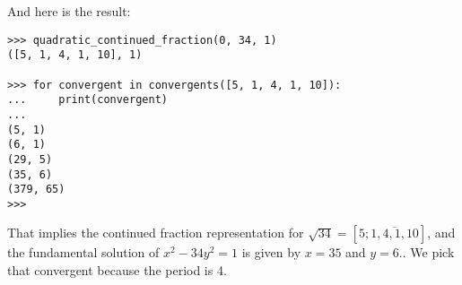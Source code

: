 \documentclass{article}
\begin{document}
And here is the result:
\begin{verbatim}
>>> quadratic_continued_fraction(0, 34, 1)
([5, 1, 4, 1, 10], 1)

>>> for convergent in convergents([5, 1, 4, 1, 10]):
...     print(convergent)
...
(5, 1)
(6, 1)
(29, 5)
(35, 6)
(379, 65)
>>>
\end{verbatim}

That implies the continued fraction representation for $ \sqrt{34} = [5;\overline{1,4,1,10}] $, and the fundamental solution of $ x^2 - 34y^2 = 1 $ is given by $ x = 35 $ and $ y = 6. $. We pick that convergent because the period is 4.
\end{document}
